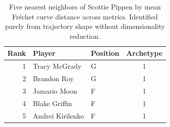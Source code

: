 \begin{table}[htbp]
  \centering\small
  \begin{tabular}{rllc}
    \toprule
    Rank & Player & Position & Archetype \\
    \midrule
    1 & Tracy McGrady & G & 1 \\
    2 & Brandon Roy & G & 1 \\
    3 & Jamario Moon & F & 1 \\
    4 & Blake Griffin & F & 1 \\
    5 & Andrei Kirilenko & F & 1 \\
    \bottomrule
  \end{tabular}
  \caption{Five nearest neighbors of Scottie Pippen by mean Fr\'{e}chet curve distance across metrics. Identified purely from trajectory shape without dimensionality reduction.}
  \label{tab:Scottie_Pippen_frechet_curve_neighbors}
\end{table}

